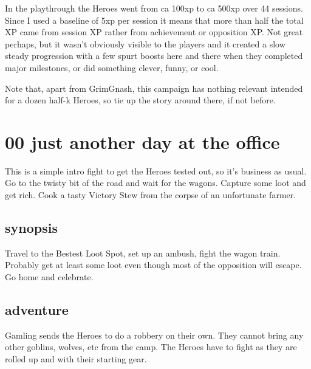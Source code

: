 In the playthrough the Heroes went from ca 100xp to ca 500xp over 44 sessions. Since I used a baseline of 5xp per session it means that more than half the total XP came from session XP rather from achievement or opposition XP. Not great perhaps, but it wasn't obviously visible to the players and it created a slow steady progression with a few spurt boosts here and there when they completed major milestones, or did something clever, funny, or cool.

Note that, apart from GrimGnash, this campaign has nothing relevant intended for a dozen half-k Heroes, so tie up the story around there, if not before. 








\clearpage
\section*{00 just another day at the office}
\label{00justanotherdayattheoffice}

This is a simple intro fight to get the Heroes tested out, so it's business as usual. Go to the twisty bit of the road and wait for the wagons. Capture some loot and get rich. Cook a tasty Victory Stew from the corpse of an unfortunate farmer.


\subsection*{synopsis}

Travel to the Bestest Loot Spot, set up an ambush, fight the wagon train. Probably get at least some loot even though most of the opposition will escape. Go home and celebrate.


\subsection*{adventure}

Gamling sends the Heroes to do a robbery on their own. They cannot bring any other goblins, wolves, etc from the camp. The Heroes have to fight as they are rolled up and with their starting gear.

